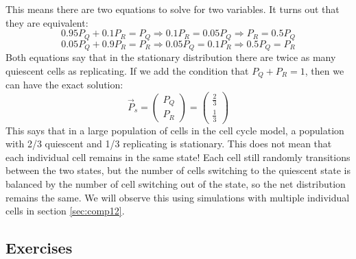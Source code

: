 \documentclass[
]{book}
\theoremstyle{definition}
\theoremstyle{definition}
\theoremstyle{definition}
\theoremstyle{remark}
\begin{document}
This means there are two equations to solve for two variables. It turns out that they are equivalent:
\[ 0.95P_Q + 0.1P_R = P_Q \Rightarrow 0.1P_R = 0.05P_Q \Rightarrow P_R = 0.5P_Q\]
\[ 0.05P_Q + 0.9P_R  = P_R \Rightarrow 0.05P_Q  = 0.1P_R  \Rightarrow  0.5P_Q =  P_R  \]
Both equations say that in the stationary distribution there are twice as many quiescent cells as replicating. If we add the condition that \(P_Q+P_R = 1\), then we can have the exact solution:
\[\vec P_s =  \left(\begin{array}{c} P_Q  \\ P_R \end{array} \right)  =  \left(\begin{array}{c} \frac{2}{3}  \\ \frac{1}{3} \end{array} \right) \]
This says that in a large population of cells in the cell cycle model, a population with 2/3 quiescent and 1/3 replicating is stationary. This does not mean that each individual cell remains in the same state! Each cell still randomly transitions between the two states, but the number of cells switching to the quiescent state is balanced by the number of cell switching out of the state, so the net distribution remains the same. We will observe this using simulations with multiple individual cells in section \ref{sec:comp12}.

\hypertarget{exercises-30}{%
\subsection{Exercises}\label{exercises-30}}
\end{document}
